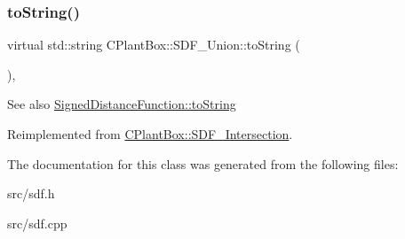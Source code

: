 \subsubsection{\texorpdfstring{to\+String()}{toString()}}
{\footnotesize\ttfamily virtual std\+::string C\+Plant\+Box\+::\+S\+D\+F\+\_\+\+Union\+::to\+String (\begin{DoxyParamCaption}{ }\end{DoxyParamCaption})\hspace{0.3cm}{\ttfamily [inline]}, {\ttfamily [virtual]}}

\begin{DoxySeeAlso}{See also}
\hyperlink{classCPlantBox_1_1SignedDistanceFunction_a9f375961d9a24b06dc669ac67aa16fa6}{Signed\+Distance\+Function\+::to\+String} 
\end{DoxySeeAlso}


Reimplemented from \hyperlink{classCPlantBox_1_1SDF__Intersection_ae095150852cdaedec026b4dea1f87c40}{C\+Plant\+Box\+::\+S\+D\+F\+\_\+\+Intersection}.



The documentation for this class was generated from the following files\+:\begin{DoxyCompactItemize}
\item 
src/sdf.\+h\item 
src/sdf.\+cpp\end{DoxyCompactItemize}
